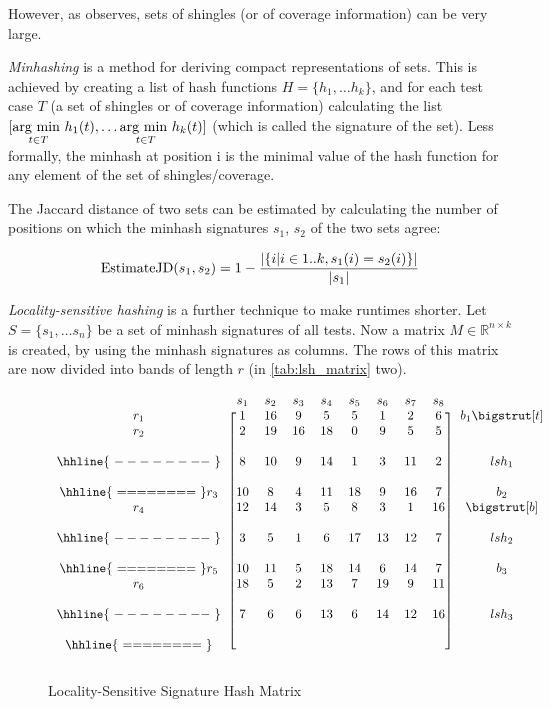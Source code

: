 However, as \cite{miranda2018fast} observes, sets of shingles (or of
coverage information) can be very large.

\textit{Minhashing} is a method for deriving compact representations of
sets. This is achieved by creating a list of hash functions $H=\{h_1,
\dots h_k\}$, and for each test case $T$ (a set of shingles or of coverage
information) calculating the list $[\underset{t \in T}{\hbox{arg min }}
h_1(t), \dots \underset{t \in T}{\hbox{arg min }} h_k(t)]$ (which is
called the signature of the set). Less formally, the minhash at position
i is the minimal value of the hash function for any element of the set
of shingles/coverage.

The Jaccard distance of two sets can be estimated by calculating the
number of positions on which the minhash signatures $s_1$, $s_2$ of the
two sets agree:

$$\hbox{EstimateJD}(s_1,s_2)=1-\frac{|\{i|i\in 1..k, s_1(i)=s_2(i)\}|}{|s_1|}$$

\textit{Locality-sensitive hashing} is a further technique to make
runtimes shorter. Let $S=\{s_1, \dots s_n\}$ be a set of minhash
signatures of all tests. Now a matrix $M \in \mathbb{R}^{n \times
k}$ is created, by using the minhash signatures as columns. The
rows of this matrix are now divided into bands of length $r$ (in
\autoref{tab:lsh_matrix} two).

\begin{figure}[H]
\[
\begin{blockarray}{cccccccccc}
	& s_1 & s_2 & s_3 & s_4 & s_5 & s_6 & s_7 & s_8 & \\
	\begin{block}{c[cccccccc]c}
		r_1 & 1 & 16 & 9 & 5 & 5 & 1 & 2 & 6 & b_1 \bigstrut[t] \\
		r_2 & 2 & 19 & 16 & 18 & 0 & 9 & 5 & 5 & \\
		\\\hhline{~--------~}
		& 8 & 10 & 9 & 14 & 1 & 3 & 11 & 2 & lsh_1 \\
		\\\hhline{~========~}
		r_3 & 10 & 8 & 4 & 11 & 18 & 9 & 16 & 7 & b_2 \\
		r_4 & 12 & 14 & 3 & 5 & 8 & 3 & 1 & 16 & \bigstrut[b]\\
		\\\hhline{~--------~}
		& 3 & 5 & 1 & 6 & 17 & 13 & 12 & 7 & lsh_2 \\
		\\\hhline{~========~}
		r_5 & 10 & 11 & 5 & 18 & 14 & 6 & 14 & 7 & b_3 \\
		r_6 & 18 & 5 & 2 & 13 & 7 & 19 & 9 & 11 & \\
		\\\hhline{~--------~}
		& 7 & 6 & 6 & 13 & 6 & 14 & 12 & 16 & lsh_3 \\
		\\\hhline{~========~} \\
	\end{block}
\end{blockarray}\vspace*{-1.25\baselineskip}
\]
\caption{Locality-Sensitive Signature Hash Matrix}\label{tab:lsh_matrix}
\end{figure}

